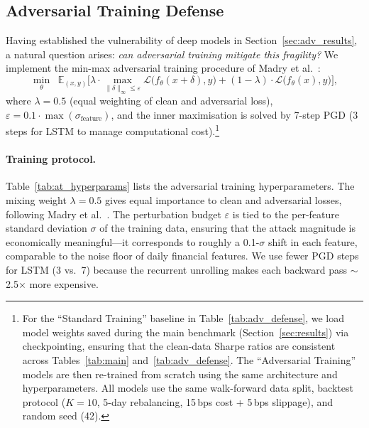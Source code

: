 \documentclass[preprint,review,12pt]{elsarticle}
\begin{document}
\subsection{Adversarial Training Defense}
\label{sec:adv_defense}

Having established the vulnerability of deep models in Section~\ref{sec:adv_results}, a natural question arises: \emph{can adversarial training mitigate this fragility?}
We implement the min-max adversarial training procedure of Madry et al.~\citep{ref_madry_pgd}:
\begin{equation}
  \min_\theta \;\; \mathbb{E}_{(x,y)} \Big[ \lambda \cdot \max_{\|\delta\|_\infty \leq \varepsilon} \mathcal{L}\big(f_\theta(x+\delta), y\big) + (1-\lambda) \cdot \mathcal{L}\big(f_\theta(x), y\big) \Big],
\end{equation}
where $\lambda = 0.5$ (equal weighting of clean and adversarial loss), $\varepsilon = 0.1 \cdot \max(\sigma_{\text{feature}})$, and the inner maximisation is solved by 7-step PGD (3 steps for LSTM to manage computational cost).\footnote{For the ``Standard Training'' baseline in Table~\ref{tab:adv_defense}, we load model weights saved during the main benchmark (Section~\ref{sec:results}) via checkpointing, ensuring that the clean-data Sharpe ratios are consistent across Tables~\ref{tab:main} and~\ref{tab:adv_defense}. The ``Adversarial Training'' models are then re-trained from scratch using the same architecture and hyperparameters. All models use the same walk-forward data split, backtest protocol ($K=10$, 5-day rebalancing, 15\,bps cost + 5\,bps slippage), and random seed (42).}

\paragraph{Training protocol.}
Table~\ref{tab:at_hyperparams} lists the adversarial training hyperparameters.
The mixing weight $\lambda=0.5$ gives equal importance to clean and adversarial losses, following Madry et al.~\citep{ref_madry_pgd}.
The perturbation budget $\varepsilon$ is tied to the per-feature standard deviation $\sigma$ of the training data, ensuring that the attack magnitude is economically meaningful---it corresponds to roughly a 0.1-$\sigma$ shift in each feature, comparable to the noise floor of daily financial features.
We use fewer PGD steps for LSTM (3 vs.\ 7) because the recurrent unrolling makes each backward pass $\sim$2.5$\times$ more expensive.
\end{document}
